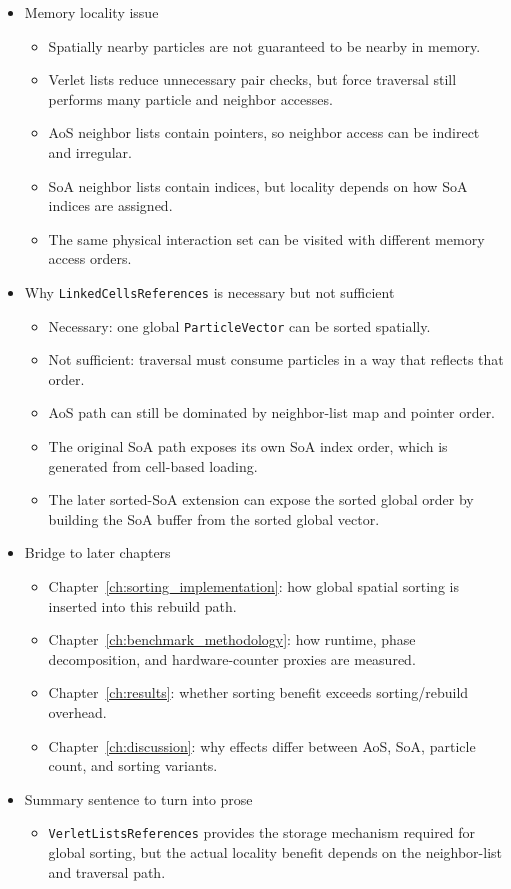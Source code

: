 \begin{itemize}
    \item Memory locality issue
    \begin{itemize}
        \item Spatially nearby particles are not guaranteed to be nearby in memory.
        \item Verlet lists reduce unnecessary pair checks, but force traversal still performs many particle and neighbor accesses.
        \item AoS neighbor lists contain pointers, so neighbor access can be indirect and irregular.
        \item SoA neighbor lists contain indices, but locality depends on how SoA indices are assigned.
        \item The same physical interaction set can be visited with different memory access orders.
    \end{itemize}

    \item Why \texttt{LinkedCellsReferences} is necessary but not sufficient
    \begin{itemize}
        \item Necessary: one global \texttt{ParticleVector} can be sorted spatially.
        \item Not sufficient: traversal must consume particles in a way that reflects that order.
        \item AoS path can still be dominated by neighbor-list map and pointer order.
        \item The original SoA path exposes its own SoA index order, which is generated from cell-based loading.
        \item The later sorted-SoA extension can expose the sorted global order by building the SoA buffer from the sorted global vector.
    \end{itemize}

    \item Bridge to later chapters
    \begin{itemize}
        \item Chapter~\ref{ch:sorting_implementation}: how global spatial sorting is inserted into this rebuild path.
        \item Chapter~\ref{ch:benchmark_methodology}: how runtime, phase decomposition, and hardware-counter proxies are measured.
        \item Chapter~\ref{ch:results}: whether sorting benefit exceeds sorting/rebuild overhead.
        \item Chapter~\ref{ch:discussion}: why effects differ between AoS, SoA, particle count, and sorting variants.
    \end{itemize}

    \item Summary sentence to turn into prose
    \begin{itemize}
        \item \texttt{VerletListsReferences} provides the storage mechanism required for global sorting, but the actual locality benefit depends on the neighbor-list and traversal path.
    \end{itemize}
\end{itemize}
